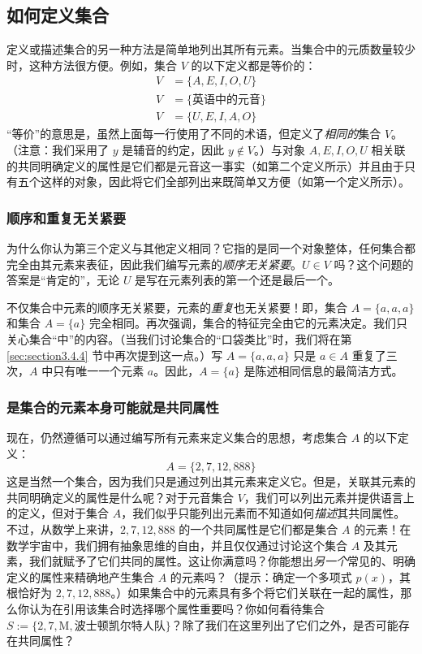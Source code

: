 \subsection{如何定义集合}

定义或描述集合的另一种方法是简单地列出其所有元素。当集合中的元质数量较少时，这种方法很方便。例如，集合 $V$ 的以下定义都是等价的：
\begin{align*}
    V &= \{A,E,I,O,U\}\\
    V &= \{\text{英语中的元音}\}\\
    V &= \{U,E,I,A,O\}
\end{align*}
``等价''的意思是，虽然上面每一行使用了不同的术语，但定义了\emph{相同的}集合 $V$。（注意：我们采用了 $y$ 是辅音的约定，因此 $y \notin V$。）与对象 $A, E, I, O, U$ 相关联的共同明确定义的属性是它们都是元音这一事实（如第二个定义所示）并且由于只有五个这样的对象，因此将它们全部列出来既简单又方便（如第一个定义所示）。

\subsubsection*{顺序和重复无关紧要}

为什么你认为第三个定义与其他定义相同？它指的是同一个对象整体，任何集合都完全由其元素来表征，因此我们编写元素的\emph{顺序无关紧要}。$U \in V$ 吗？这个问题的答案是``肯定的''，无论 $U$ 是写在元素列表的第一个还是最后一个。

不仅集合中元素的顺序无关紧要，元素的\emph{重复}也无关紧要！即，集合 $A=\{a,a,a\}$ 和集合 $A=\{a\}$ 完全相同。再次强调，集合的特征完全由它的元素决定。我们只关心集合``中''的内容。（当我们讨论集合的``口袋类比''时，我们将在第 \ref{sec:section3.4.4} 节中再次提到这一点。）写 $A = \{a, a, a\}$ 只是 $a \in A$ 重复了三次，$A$ 中只有唯一一个元素 $a$。因此，$A = \{a\}$ 是陈述相同信息的最简洁方式。

\subsubsection*{是集合的元素本身可能就是共同属性}

现在，仍然遵循可以通过编写所有元素来定义集合的思想，考虑集合 $A$ 的以下定义：
\[A=\{2, 7, 12, 888\}\]
这是当然一个集合，因为我们只是通过列出其元素来定义它。但是，关联其元素的共同明确定义的属性是什么呢？对于元音集合 $V$，我们可以列出元素并提供语言上的定义，但对于集合 $A$，我们似乎只能列出元素而不知道如何\emph{描述}其共同属性。不过，从数学上来讲，$2,7,12,888$ 的一个共同属性是它们都是集合 $A$ 的元素！在数学宇宙中，我们拥有抽象思维的自由，并且仅仅通过讨论这个集合 $A$ 及其元素，我们就赋予了它们共同的属性。这让你满意吗？你能想出\emph{另一个}常见的、明确定义的属性来精确地产生集合 $A$ 的元素吗？（提示：确定一个多项式 $p(x)$，其根恰好为 $2,7, 12, 888$。）如果集合中的元素具有多个将它们关联在一起的属性，那么你认为在引用该集合时选择哪个属性重要吗？你如何看待集合 $S := \{2, 7, \text{M}, \text{波士顿凯尔特人队}\}$？除了我们在这里列出了它们之外，是否可能存在共同属性？

